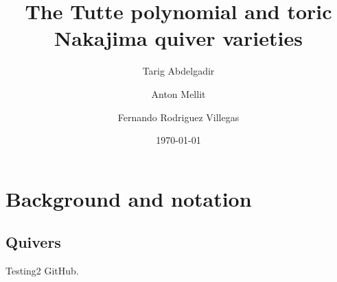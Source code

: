 \documentclass{amsart}
\title{The Tutte polynomial and toric Nakajima quiver varieties}
\author{Tarig Abdelgadir}
\author{Anton Mellit}
\author{Fernando Rodriguez Villegas}
\date{\today}
\theoremstyle{definition}
\begin{document}
\maketitle




\section{Background and notation}
\subsection{Quivers}
Testing2 GitHub.
\end{document}
